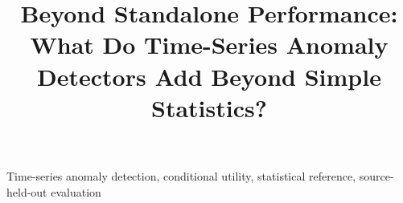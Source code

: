 \documentclass[letterpaper]{article}
\title{Beyond Standalone Performance: What Do Time-Series Anomaly Detectors Add Beyond Simple Statistics?}
\begin{document}
\raggedbottom
\maketitle

\begin{keywords}
Time-series anomaly detection, conditional utility, statistical reference, source-held-out evaluation
\end{keywords}

\clearpage
\balance


\end{document}

